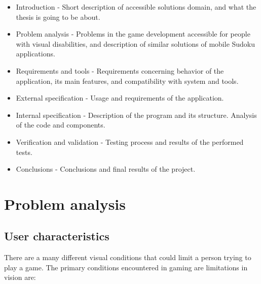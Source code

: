 \documentclass[a4paper,twoside,12pt]{book}
\begin{document}
\begin{itemize}
\item Introduction - Short description of accessible solutions domain, and what the thesis is going to be about.
\item Problem analysis - Problems in the game development accessible for people with visual disabilities, and description of similar solutions of mobile Sudoku applications.
\item Requirements and tools - Requirements concerning behavior of the application, its main features, and compatibility with system and tools.
\item External specification - Usage and requirements of the application.
\item Internal specification - Description of the program and its structure. Analysis of the code and components.
\item Verification and validation - Testing process and results of the performed tests.
\item Conclusions - Conclusions and final results of the project.
\end{itemize}

\chapter{Problem analysis}




\section {User characteristics}

\par There are a many different visual conditions that could limit a person trying to play a game. The primary conditions encountered in gaming are limitations in vision are:\cite{bib:internet}
\end{document}
